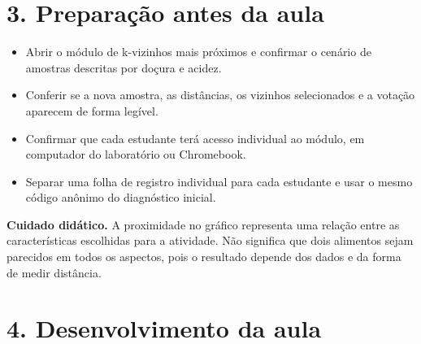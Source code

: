 \documentclass[12pt,a4paper]{article}
\newcommand{\bloco}[1]{%
  \vspace{0.25em}
  \noindent\colorbox{cinza}{\parbox{0.96\linewidth}{#1}}%
  \vspace{0.3em}
}
\begin{document}
\section*{3. Preparação antes da aula}

\begin{itemize}
  \item Abrir o módulo de k-vizinhos mais próximos e confirmar o cenário de amostras descritas por doçura e acidez.
  \item Conferir se a nova amostra, as distâncias, os vizinhos selecionados e a votação aparecem de forma legível.
  \item Confirmar que cada estudante terá acesso individual ao módulo, em computador do laboratório ou Chromebook.
  \item Separar uma folha de registro individual para cada estudante e usar o mesmo código anônimo do diagnóstico inicial.
\end{itemize}

\bloco{\textbf{Cuidado didático.} A proximidade no gráfico representa uma relação entre as características escolhidas para a atividade. Não significa que dois alimentos sejam parecidos em todos os aspectos, pois o resultado depende dos dados e da forma de medir distância.}

\section*{4. Desenvolvimento da aula}
\end{document}
